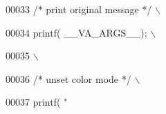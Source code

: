 \begin{DoxyCode}
00033         \textcolor{comment}{/*      print original message  */}                                                                                              \(\backslash\)
      
00034         printf( \_\_VA\_ARGS\_\_);                                                                                                           \(\backslash\)
      
00035                                                                                                                                                                 \(\backslash\)
      
00036         \textcolor{comment}{/*      unset color mode        */}                                                                                                      \(\backslash\)
      
00037         printf( "%
      

\end{DoxyCode}
